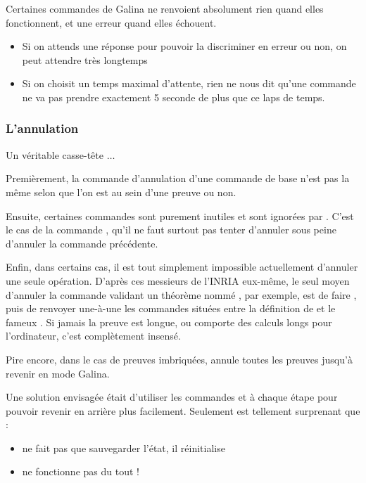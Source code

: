         	Certaines commandes de Galina ne renvoient absolument rien quand elles fonctionnent, et une erreur quand elles échouent.
        	\begin{itemize}
        		\item Si on attends une réponse pour pouvoir la discriminer en erreur ou non, on peut attendre très longtemps
        		\item Si on choisit un temps maximal d'attente, rien ne nous dit qu'une commande ne va pas prendre exactement 5 seconde de plus que ce laps de temps.
        	\end{itemize}

    	\subsubsection{L'annulation}

    	    Un véritable casse-tête $\ldots$
    	    
    	    Premièrement, la commande d'annulation d'une commande de base n'est pas la même selon que l'on est au sein d'une preuve ou non.
    	    
    	    Ensuite, certaines commandes sont purement inutiles et sont ignorées par \coqtop.
    	    C'est le cas de la commande , qu'il ne faut surtout pas tenter d'annuler sous peine d'annuler la commande précédente.
    	    
    	    Enfin, dans certains cas, il est tout simplement impossible actuellement d'annuler une seule opération.
    	    D'après ces messieurs de l'INRIA eux-même, le seul moyen d'annuler la commande  validant un théorème nommé , par exemple, est de faire , puis de renvoyer une-à-une les commandes situées entre la définition de  et le fameux .
    	    Si jamais la preuve est longue, ou comporte des calculs longs pour l'ordinateur, c'est complètement insensé.
    	    
    	    Pire encore, dans le cas de preuves imbriquées,  annule toutes les preuves jusqu'à revenir en mode Galina.
    	    
            Une solution envisagée était d'utiliser les commandes  et  à chaque étape pour pouvoir revenir en arrière plus facilement.
            Seulement \coqtop est tellement surprenant que :
            \begin{itemize}
             	\item {} ne fait pas que sauvegarder l'état, il réinitialise \coqtop
             	\item {} ne fonctionne pas du tout !
             \end{itemize}
		
